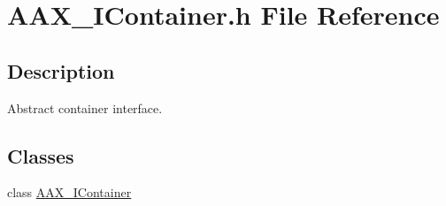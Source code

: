 \hypertarget{a00572}{}\section{A\+A\+X\+\_\+\+I\+Container.\+h File Reference}
\label{a00572}


\subsection{Description}
Abstract container interface. 

\subsection*{Classes}
\begin{DoxyCompactItemize}
\item 
class \mbox{\hyperlink{a01785}{A\+A\+X\+\_\+\+I\+Container}}
\end{DoxyCompactItemize}
